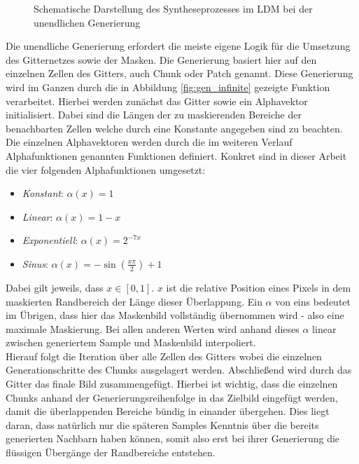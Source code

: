 \begin{figure}[htbp]
    \centering
    \caption{Schematische Darstellung des Syntheseprozesses im \ac{LDM} bei der unendlichen Generierung}
    \label{fig:infinite}
\end{figure}
Die unendliche Generierung erfordert die meiste eigene Logik für die Umsetzung des Gitternetzes sowie der Masken. Die Generierung basiert hier auf den einzelnen Zellen des Gitters, auch Chunk oder Patch genannt. Diese Generierung wird im Ganzen durch die in Abbildung \ref{fig:gen_infinite} gezeigte Funktion verarbeitet. Hierbei werden zunächst das Gitter sowie ein Alphavektor initialisiert. Dabei sind die Längen der zu maskierenden Bereiche der benachbarten Zellen welche durch eine Konstante angegeben sind zu beachten. Die einzelnen Alphavektoren werden durch die im weiteren Verlauf Alphafunktionen genannten Funktionen definiert. Konkret sind in dieser Arbeit die vier folgenden Alphafunktionen umgesetzt: 
\begin{itemize}
    \item \textit{Konstant}: $\alpha(x) = 1$
    \item \textit{Linear}: $\alpha(x) = 1 - x$
    \item \textit{Exponentiell}: $\alpha(x) = 2^{-7x}$
    \item \textit{Sinus}: $\alpha(x) = -\sin(\frac{x\pi}{2}) + 1$
\end{itemize}
Dabei gilt jeweils, dass $x \in [0,1]$. $x$ ist die relative Position eines Pixels in dem maskierten Randbereich der Länge dieser Überlappung. Ein $\alpha$ von eins bedeutet im Übrigen, dass hier das Maskenbild vollständig übernommen wird - also eine maximale Maskierung. Bei allen anderen Werten wird anhand dieses $\alpha$ linear zwischen generiertem Sample und Maskenbild interpoliert. \\
Hierauf folgt die Iteration über alle Zellen des Gitters wobei die einzelnen Generationschritte des Chunks ausgelagert werden. Abschließend wird durch das Gitter das finale Bild zusammengefügt. Hierbei ist wichtig, dass die einzelnen Chunks anhand der Generierungsreihenfolge in das Zielbild eingefügt werden, damit die überlappenden Bereiche bündig in einander übergehen. Dies liegt daran, dass natürlich nur die späteren Samples Kenntnis über die bereits generierten Nachbarn haben können, somit also erst bei ihrer Generierung die flüssigen Übergänge der Randbereiche entstehen. 
